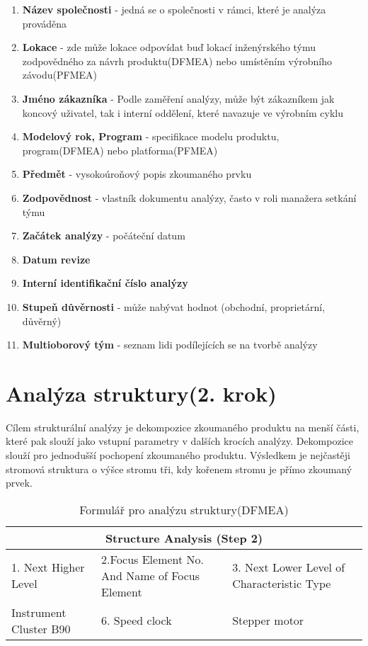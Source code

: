 \begin{enumerate}
	\item \textbf{Název společnosti} - jedná se o společnosti v rámci, které je analýza prováděna
	\item \textbf{Lokace} - zde může lokace odpovídat buď lokací inženýrského týmu zodpovědného za návrh produktu(DFMEA) nebo umístěním výrobního závodu(PFMEA) 
	\item \textbf{Jméno zákazníka} - Podle zaměření analýzy, může být zákazníkem jak koncový uživatel, tak i interní oddělení, které navazuje ve výrobním cyklu
 \item \textbf{Modelový rok, Program} - specifikace modelu produktu, program(DFMEA) nebo platforma(PFMEA)
 \item \textbf{Předmět} - vysokoúroňový popis zkoumaného prvku
 \item \textbf{Zodpovědnost} - vlastník dokumentu analýzy, často v roli manažera setkání týmu
 \item \textbf{Začátek analýzy} - počáteční datum
 \item \textbf{Datum revize} 
 \item \textbf{Interní identifikační číslo analýzy}
 \item \textbf{Stupeň důvěrnosti} - může nabývat hodnot (obchodní, proprietární, důvěrný)
 \item \textbf{Multioborový tým} - seznam lidi podílejících se na tvorbě analýzy
\end{enumerate}

\section{Analýza struktury(2. krok)}
Cílem strukturální analýzy je dekompozice zkoumaného produktu na menší části, které pak slouží jako vstupní parametry v dalších krocích analýzy. Dekompozice slouží pro jednodušší pochopení zkoumaného produktu. Výsledkem je nejčastěji stromová struktura o výšce stromu tři, kdy kořenem stromu je přímo zkoumaný prvek.





\begin{center}
\begin{table}[h]
	\centering
	\caption{Formulář pro analýzu struktury(DFMEA) }
	\label{tab:structure_DFMEA}
\begin{tabular}{ |p{4cm}|p{3cm}|p{3cm}|  }
 \hline
 \multicolumn{3}{|c|}{Structure Analysis (Step 2)} \\
 \hline
 1. Next Higher Level& 2.Focus Element
No. And Name of Focus Element &3. Next Lower Level of Characteristic Type\\
 \hline
 Instrument Cluster B90   & 6. Speed clock    &Stepper motor\\


 \hline
\end{tabular}\  
\end{table}
\end{center}

